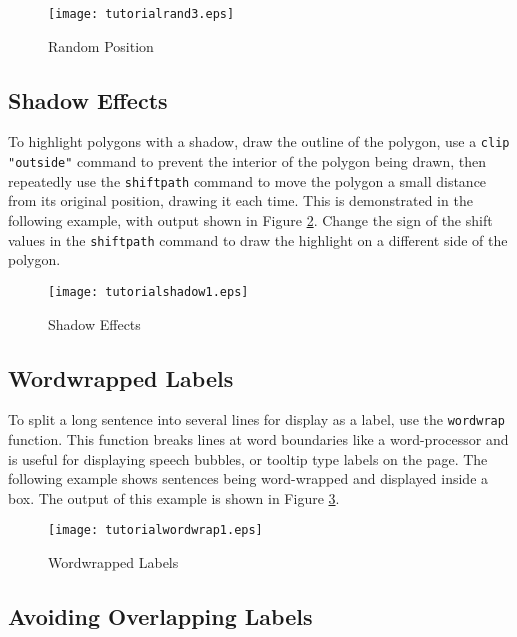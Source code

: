 \begin{figure}[htb]
\texttt{[image: tutorialrand3.eps]}
\caption{Random Position}
\label{tutorialrand3}
\end{figure}

\subsection{Shadow Effects}
\label{tutorialshadow}

To highlight polygons with a shadow, draw the outline of the polygon, use a
\texttt{clip "outside"}
command to prevent the interior of the polygon being drawn,
then repeatedly use the \texttt{shiftpath} command to move the polygon a small
distance from its original position, drawing it each time.  This is
demonstrated in the following example, with output shown in Figure
\ref{tutorialshadow1}.  Change the sign of the shift values in the
\texttt{shiftpath} command to draw the highlight on a different side of the
polygon.



\begin{figure}[htb]
\texttt{[image: tutorialshadow1.eps]}
\caption{Shadow Effects}
\label{tutorialshadow1}
\end{figure}

\subsection{Wordwrapped Labels}

To split a long sentence into several lines for display as a label, use
the \texttt{wordwrap} function.
This function breaks lines at word boundaries like a word-processor
and is useful for displaying speech bubbles, or tooltip type
labels on the page.
The following example shows sentences being word-wrapped and
displayed inside a box.  The output of this example
is shown in Figure \ref{tutorialwordwrap1}.



\begin{figure}[htb]
\texttt{[image: tutorialwordwrap1.eps]}
\caption{Wordwrapped Labels}
\label{tutorialwordwrap1}
\end{figure}

\subsection{Avoiding Overlapping Labels}

